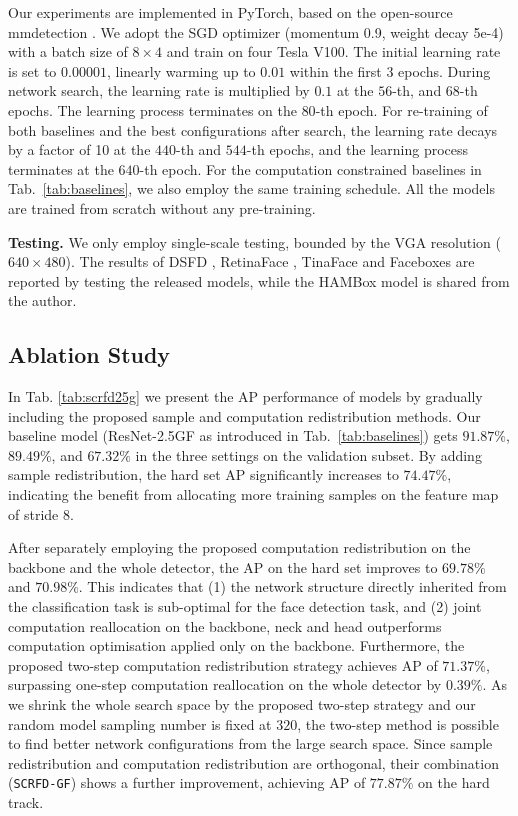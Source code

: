 \documentclass[10pt,twocolumn,letterpaper]{article}
\newcommand{\dsname}[1]{\texttt{\small #1}\xspace}
\newcommand{\scrfdf}[1]{\dsname{SCRFD-\text{#1}GF}}
\begin{document}
Our experiments are implemented in PyTorch, based on the open-source mmdetection \cite{chen2019mmdetection}. 
We adopt the SGD optimizer (momentum 0.9, weight decay 5e-4) with a batch size of $8\times 4$ and train on four Tesla V100. 
The initial learning rate is set to $0.00001$, linearly warming up to $0.01$ within the first $3$ epochs. During network search, the learning rate is multiplied by $0.1$ at the $56$-th, and $68$-th epochs. The learning process terminates on the $80$-th epoch. For re-training of both baselines and the best configurations after search, the learning rate decays by a factor of 10 at the $440$-th and $544$-th epochs, and the learning process terminates at the $640$-th epoch. For the computation constrained baselines in Tab.~\ref{tab:baselines}, we also employ the same training schedule. All the models are trained from scratch without any pre-training.

\noindent\textbf{Testing.}
We only employ single-scale testing, bounded by the VGA resolution ($640\times480$). 
The results of DSFD \cite{li2019dsfd}, RetinaFace \cite{deng2019retinaface}, TinaFace \cite{zhu2020tinaface} and Faceboxes \cite{zhang2017faceboxes} are reported by testing the released models, while the HAMBox \cite{liu2019hambox} model is shared from the author.

\subsection{Ablation Study}
In Tab. \ref{tab:scrfd25g} we present the AP performance of models by gradually including the proposed sample and computation redistribution methods. Our baseline model (\ie ResNet-2.5GF as introduced in Tab.~\ref{tab:baselines}) gets $91.87\%$, $89.49\%$, and $67.32\%$ in the three settings on the validation subset. By adding sample redistribution, the hard set AP significantly increases to $74.47\%$, indicating the benefit from allocating more training samples on the feature map of stride 8. 

After separately employing the proposed computation redistribution on the backbone and the whole detector, the AP on the hard set improves to $69.78\%$ and $70.98\%$. This indicates that (1) the network structure directly inherited from the classification task is sub-optimal for the face detection task, and (2) joint computation reallocation on the backbone, neck and head outperforms computation optimisation applied only on the backbone. Furthermore, the proposed two-step computation redistribution strategy achieves AP of $71.37\%$, surpassing one-step computation reallocation on the whole detector by $0.39\%$. As we shrink the whole search space by the proposed two-step strategy and our random model sampling number is fixed at $320$, the two-step method is possible to find better network configurations from the large search space. Since sample redistribution and computation redistribution are orthogonal, their combination (\ie \scrfdf{2.5}) shows a further improvement, achieving AP of $77.87\%$ on the hard track.
\end{document}
